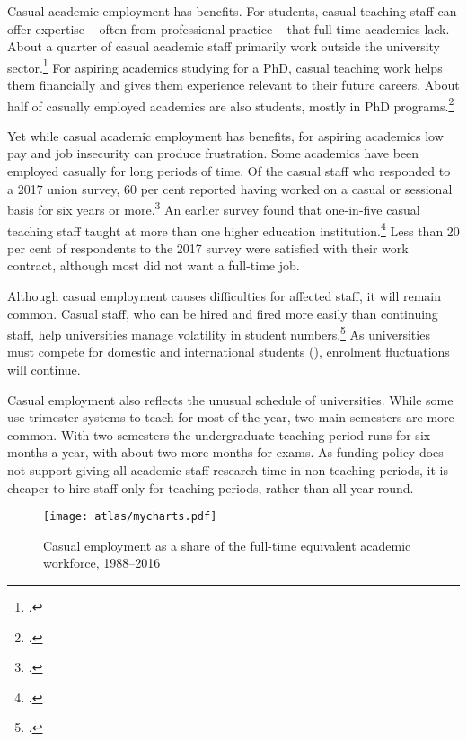 \documentclass{grattan}
\begin{document}
Casual academic employment has benefits. For students, casual teaching staff can offer expertise -- often from professional practice -- that full-time academics lack. About a quarter of casual academic staff primarily work outside the university sector.\footcite[][264]{May2013thecasualacademic} For aspiring academics studying for a PhD, casual teaching work helps them financially and gives them experience relevant to their future careers. About half of casually employed academics are also students, mostly in PhD programs.\footcites[][38]{Bexley2011theaustralianacad}[][59]{Strachan2012workandcareersin}

Yet while casual academic employment has benefits, for aspiring academics low pay and job insecurity can produce frustration. Some academics have been employed casually for long periods of time. Of the casual staff who responded to a 2017 union survey, 60 per cent reported having worked on a casual or sessional basis for six years or more.\footcite[][]{Evans2017casualsstillstrug} An earlier survey found that one-in-five casual teaching staff taught at more than one higher education institution.\footcite[][22]{NTEU2015stateofunisurvey} Less than 20 per cent of respondents to the 2017 survey were satisfied with their work contract, although most did not want a full-time job.

Although casual employment causes difficulties for affected staff, it will remain common. Casual staff, who can be hired and fired more easily than continuing staff, help universities manage volatility in student numbers.\footcite[][1]{Andrews2016contingentacademic} As universities must compete for domestic and international students (), enrolment fluctuations will continue.

Casual employment also reflects the unusual schedule of universities. While some use trimester systems to teach for most of the year, two main semesters are more common. With two semesters the undergraduate teaching period runs for six months a year, with about two more months for exams. As funding policy does not support giving all academic staff research time in non-teaching periods, it is cheaper to hire staff only for teaching periods, rather than all year round.


    \begin{figure} %
    \caption{Casual employment as a share of the full-time equivalent academic workforce, 1988--2016}\label{fig:casual-employment-as-a-share-of-the-fulltime-equivalent-academic-workforce-19882016}
    \texttt{[image: atlas/mycharts.pdf]}
    \end{figure}
\end{document}
